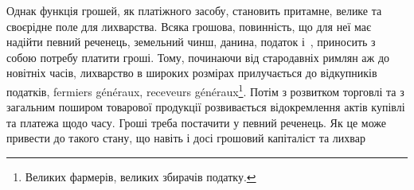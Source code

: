 Однак функція грошей, як платіжного засобу, становить притамне, велике
та своєрідне поле для лихварства. Всяка грошова, повинність, що для неї має
надійти певний реченець, земельний чинш, данина, податок і~, приносить
з собою потребу платити гроші. Тому, починаючи від стародавніх римлян аж
до новітніх часів, лихварство в широких розмірах прилучається до відкупників
податків, fermiers généraux, receveurs généraux\footnote*{
Великих фармерів, великих збирачів податку. 
}. Потім з розвитком торговлі та
з загальним поширом товарової продукції розвивається відокремлення актів купівлі
та платежа щодо часу. Гроші треба постачити у певний реченець. Як це може
привести до такого стану, що навіть і досі грошовий капіталіст та лихвар
\parbreak{}  %

